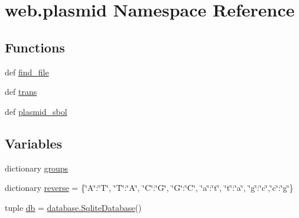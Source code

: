 \hypertarget{namespaceweb_1_1plasmid}{\section{web.\-plasmid Namespace Reference}
\label{namespaceweb_1_1plasmid}
}
\subsection*{Functions}
\begin{DoxyCompactItemize}
\item 
def \hyperlink{namespaceweb_1_1plasmid_ae547689a9a88efbb40244b70932d8fb4}{find\-\_\-file}
\item 
def \hyperlink{namespaceweb_1_1plasmid_abe025b0e48e975deecc57ad618ff0ea7}{trans}
\item 
def \hyperlink{namespaceweb_1_1plasmid_a815b6bb1e8ce0d7c5e74517980fe8956}{plasmid\-\_\-sbol}
\end{DoxyCompactItemize}
\subsection*{Variables}
\begin{DoxyCompactItemize}
\item 
dictionary \hyperlink{namespaceweb_1_1plasmid_aafb74ca9719e0596b5c9c71f5f493d9d}{groups}
\item 
dictionary \hyperlink{namespaceweb_1_1plasmid_ac9b01088cbfe70ce3083dc036af63196}{reverse} = \{\char`\"{}A\char`\"{}\-:\char`\"{}T\char`\"{}, \char`\"{}T\char`\"{}\-:\char`\"{}A\char`\"{}, \char`\"{}C\char`\"{}\-:\char`\"{}G\char`\"{}, \char`\"{}G\char`\"{}\-:\char`\"{}C\char`\"{}, \char`\"{}a\char`\"{}\-:\char`\"{}t\char`\"{}, \char`\"{}t\char`\"{}\-:\char`\"{}a\char`\"{}, \char`\"{}g\char`\"{}\-:\char`\"{}c\char`\"{},\char`\"{}c\char`\"{}\-:\char`\"{}g\char`\"{}\}
\item 
tuple \hyperlink{namespaceweb_1_1plasmid_ad2b82bff33d21eabbac7f05683887542}{db} = \hyperlink{classweb_1_1database_1_1_sqlite_database}{database.\-Sqlite\-Database}()
\end{DoxyCompactItemize}


